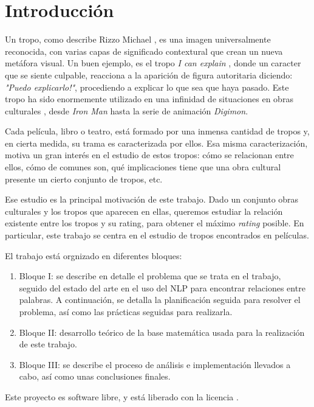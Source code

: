 \chapter{Introducción}

Un tropo, como describe Rizzo Michael \cite{rizzo2013art}, es una imagen universalmente reconocida, con varias capas de significado contextural que crean un nueva metáfora visual. Un buen ejemplo, es el tropo \emph{I can explain} \cite{tropo:icanexplain}, donde un caracter que se siente culpable, reacciona a la aparición de figura autoritaria diciendo: \emph{"Puedo explicarlo!"}, procediendo a explicar lo que sea que haya pasado. Este tropo ha sido enormemente utilizado en una infinidad de situaciones en obras culturales \cite{tropo:icanexplain}, desde \emph{Iron Man} hasta la serie de animación \emph{Digimon}.

Cada película, libro o teatro, está formado por una inmensa cantidad de tropos y, en cierta medida, su trama es caracterizada por ellos. Esa misma caracterización, motiva un gran interés en el estudio de estos tropos: cómo se relacionan entre ellos, cómo de comunes son, qué implicaciones tiene que una obra cultural presente un cierto conjunto de tropos, etc.

Ese estudio es la principal motivación de este trabajo. Dado un conjunto obras culturales y los tropos que aparecen en ellas, queremos estudiar la relación existente entre los tropos y su rating, para obtener el máximo \emph{rating} posible. En particular, este trabajo se centra en el estudio de tropos encontrados en películas.


El trabajo está orgnizado en diferentes bloques:

\begin{enumerate}
    \item Bloque I: se describe en detalle el problema que se trata en el trabajo, seguido del estado del arte en el uso del NLP para encontrar relaciones entre palabras. A continuación, se detalla la planificación seguida para resolver el problema, así como las prácticas seguidas para realizarla.
    \item Bloque II: desarrollo teórico de la base matemática usada para la realización de este trabajo.
    \item Bloque III: se describe el proceso de análisis e implementación llevados a cabo, así como unas conclusiones finales.
\end{enumerate}

Este proyecto es software libre, y está liberado con la licencia \cite{gplv3}.